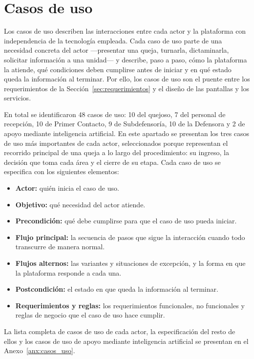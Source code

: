 	\normalsize
	\setlength{\tabcolsep}{6pt}
	\renewcommand{\arraystretch}{1}
	
	\section{Casos de uso}
\label{sec:casos_uso}
Los casos de uso describen las interacciones entre cada actor y la plataforma con independencia de la tecnología empleada. Cada caso de uso parte de una necesidad concreta del actor ---presentar una queja, turnarla, dictaminarla, solicitar información a una unidad--- y describe, paso a paso, cómo la plataforma la atiende, qué condiciones deben cumplirse antes de iniciar y en qué estado queda la información al terminar. Por ello, los casos de uso son el puente entre los requerimientos de la Sección~\ref{sec:requerimientos} y el diseño de las pantallas y los servicios.

En total se identificaron 48 casos de uso: 10 del quejoso, 7 del personal de recepción, 10 de Primer Contacto, 9 de Subdefensoría, 10 de la Defensora y 2 de apoyo mediante inteligencia artificial. En este apartado se presentan los tres casos de uso más importantes de cada actor, seleccionados porque representan el recorrido principal de una queja a lo largo del procedimiento: su ingreso, la decisión que toma cada área y el cierre de su etapa. Cada caso de uso se especifica con los siguientes elementos:

\begin{itemize}
	\item \textbf{Actor:} quién inicia el caso de uso.
	\item \textbf{Objetivo:} qué necesidad del actor atiende.
	\item \textbf{Precondición:} qué debe cumplirse para que el caso de uso pueda iniciar.
	\item \textbf{Flujo principal:} la secuencia de pasos que sigue la interacción cuando todo transcurre de manera normal.
	\item \textbf{Flujos alternos:} las variantes y situaciones de excepción, y la forma en que la plataforma responde a cada una.
	\item \textbf{Postcondición:} el estado en que queda la información al terminar.
	\item \textbf{Requerimientos y reglas:} los requerimientos funcionales, no funcionales y reglas de negocio que el caso de uso hace cumplir.
\end{itemize}

La lista completa de casos de uso de cada actor, la especificación del resto de ellos y los casos de uso de apoyo mediante inteligencia artificial se presentan en el Anexo~\ref{anx:casos_uso}.

